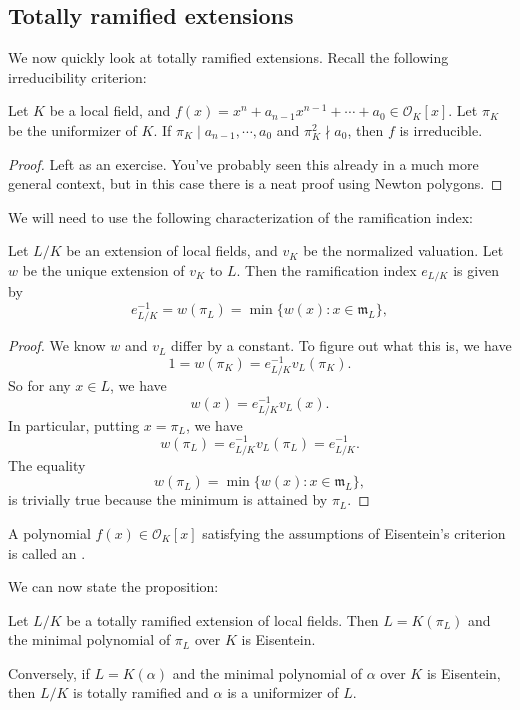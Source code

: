 \documentclass[a4paper]{article}
\begin{document}
\subsection{Totally ramified extensions}
We now quickly look at totally ramified extensions. Recall the following irreducibility criterion:
\begin{thm}
  Let $K$ be a local field, and $f(x) = x^n + a_{n - 1} x^{n - 1} + \cdots + a_0 \in \mathcal{O}_K[x]$. Let $\pi_K$ be the uniformizer of $K$. If $\pi_K \mid a_{n - 1}, \cdots, a_0$ and $\pi_K^2 \nmid a_0$, then $f$ is irreducible.
\end{thm}

\begin{proof}
  Left as an exercise. You've probably seen this already in a much more general context, but in this case there is a neat proof using Newton polygons.
\end{proof}

We will need to use the following characterization of the ramification index:
\begin{prop}
  Let $L/K$ be an extension of local fields, and $v_K$ be the normalized valuation. Let $w$ be the unique extension of $v_K$ to $L$. Then the ramification index $e_{L/K}$ is given by
  \[
    e_{L/K}^{-1} = w(\pi_L) = \min \{w(x): x \in \mathfrak{m}_L\},
  \]
\end{prop}

\begin{proof}
  We know $w$ and $v_L$ differ by a constant. To figure out what this is, we have
  \[
    1 = w(\pi_K) = e_{L/K}^{-1} v_L(\pi_K).
  \]
  So for any $x \in L$, we have
  \[
    w(x) = e_{L/K}^{-1} v_L(x).
  \]
  In particular, putting $x = \pi_L$, we have
  \[
    w(\pi_L) = e_{L/K}^{-1} v_L(\pi_L) = e_{L/K}^{-1}.
  \]
  The equality
  \[
    w(\pi_L) = \min \{w(x): x \in \mathfrak{m}_L\},
  \]
  is trivially true because the minimum is attained by $\pi_L$.
\end{proof}

\begin{defi}
  A polynomial $f(x) \in \mathcal{O}_K[x]$ satisfying the assumptions of Eisentein's criterion is called an .
\end{defi}
We can now state the proposition:
\begin{prop}
  Let $L/K$ be a totally ramified extension of local fields. Then $L = K(\pi_L)$ and the minimal polynomial of $\pi_L$ over $K$ is Eisentein.

  Conversely, if $L = K(\alpha)$ and the minimal polynomial of $\alpha$ over $K$ is Eisentein, then $L/K$ is totally ramified and $\alpha$ is a uniformizer of $L$.
\end{prop}
\end{document}
